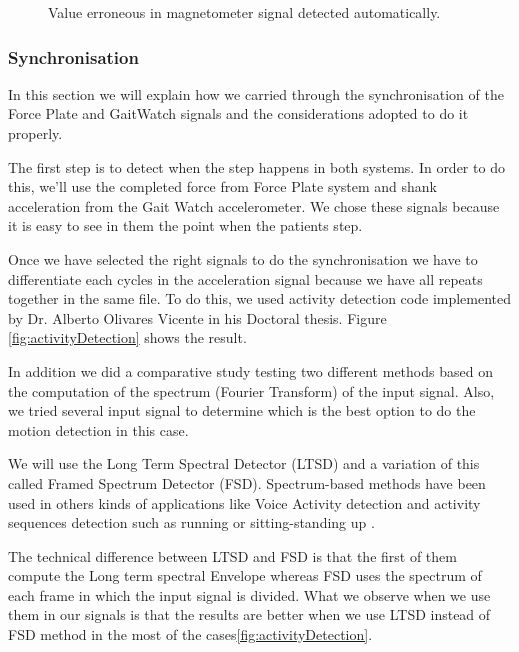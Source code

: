 \begin{figure}[H]
	\centering
	\caption{Value erroneous in magnetometer signal detected automatically.}
	\label{fig:GWErrorDetected}
	\end{figure}



\subsubsection{Synchronisation}	
In this section we will explain how we carried through the synchronisation of the Force Plate and GaitWatch signals and the considerations adopted to do it properly.

The first step is to detect when the step happens in both systems. In order to do this, we’ll use the completed force from Force Plate system and shank acceleration from the Gait Watch accelerometer. We chose these signals because it is easy to see in them the point when the patients step.

Once we have selected the right signals to do the synchronisation we have to differentiate each cycles in the acceleration signal because we have all repeats together in the same file. To do this, we used activity detection code implemented by Dr. Alberto Olivares Vicente in his Doctoral thesis. Figure \ref{fig:activityDetection} shows the result.

In addition we did a comparative study testing two different methods based on the  computation of the spectrum (Fourier Transform) of the input signal. Also, we tried several input signal to determine which is the best option to do the motion detection in this case.

We will use the Long Term Spectral Detector (LTSD) \cite{Ramirez2004} and a variation of this called Framed Spectrum Detector (FSD). Spectrum-based methods have been used in others kinds of applications like Voice Activity detection \cite{Ramirez2006}\cite{Ramirez2007} and activity sequences detection such as running or sitting-standing up\cite{A.Olivares2013} .

The technical difference between LTSD and FSD is that the first of them compute the Long term spectral Envelope whereas FSD uses the spectrum of each frame  in which the input signal is divided\cite{A.Olivares2013}. What we observe when we use them in our signals is that the results are better when we use LTSD instead of FSD method  in the most of the cases\ref{fig:activityDetection}.

